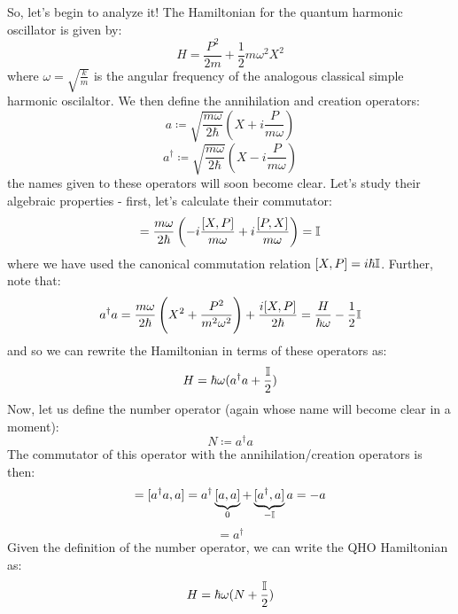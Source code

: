 So, let's begin to analyze it! The Hamiltonian for the quantum harmonic oscillator is given by:
\begin{equation}
    H = \frac{P^2}{2m} + \frac{1}{2}m\omega^2X^2
\end{equation}
where $\omega = \sqrt{\frac{k}{m}}$ is the angular frequency of the analogous classical simple harmonic oscilaltor. We then define the annihilation and creation operators:
\begin{equation}\label{eq-a}
    a \coloneqq \sqrt{\frac{m\omega}{2\hbar}}\left(X + i\frac{P}{m\omega}\right)
\end{equation}
\begin{equation}\label{eq-adag}
    a^\dag \coloneqq \sqrt{\frac{m\omega}{2\hbar}}\left(X - i\frac{P}{m\omega}\right)
\end{equation}
the names given to these operators will soon become clear.  Let's study their algebraic properties - first, let's calculate their commutator:
\begin{equation}
    [a, a^\dag] = \frac{m\omega}{2\hbar}\left(-i\frac{[X, P]}{m\omega} + i\frac{[P, X]}{m\omega}\right) = \II
\end{equation}
where we have used the canonical commutation relation $[X, P] = i\hbar\mathbb{I}$. Further, note that:
\begin{equation}
    a^\dag a = \frac{m\omega}{2\hbar}\left(X^2 + \frac{P^2}{m^2\omega^2}\right) + \frac{i[X, P]}{2\hbar} = \frac{H}{\hbar\omega} - \frac{1}{2}\mathbb{I}
\end{equation}
and so we can rewrite the Hamiltonian in terms of these operators as:
\begin{equation}
    H = \hbar\omega(a^\dag a + \frac{\mathbb{I}}{2})
\end{equation}
Now, let us define the number operator (again whose name will become clear in a moment):
\begin{equation}
    N \coloneqq a^\dag a
\end{equation}
The commutator of this operator with the annihilation/creation operators is then:
\begin{equation}
    [N, a] = [a^\dag a, a] = a^\dag\underbrace{[a, a]}_{0} + \underbrace{[a^\dag, a]}_{-\II}a = -a
\end{equation}
\begin{equation}
    [N, a^\dag] = a^\dag
\end{equation}
Given the definition of the number operator, we can write the QHO Hamiltonian as:
\begin{equation}
    H = \hbar\omega(N + \frac{\mathbb{I}}{2})
\end{equation}
